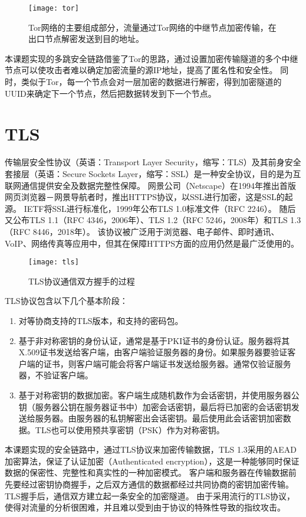 \begin{figure}[H]
  \centering
  \texttt{[image: tor]}
  \caption{Tor网络的主要组成部分，流量通过Tor网络的中继节点加密传输，在出口节点解密发送到目的地址。}
\end{figure}

本课题实现的多跳安全链路借鉴了Tor的思路，通过设置加密传输隧道的多个中继节点可以使攻击者难以确定加密流量的源IP地址，提高了匿名性和安全性。
同时，类似于Tor，每一个节点会对一层加密的数据进行解密，得到加密隧道的UUID来确定下一个节点，然后把数据转发到下一个节点。

\section{TLS}
传输层安全性协议（英语：Transport Layer Security，缩写：TLS）及其前身安全套接层（英语：Secure Sockets Layer，缩写：SSL）是一种安全协议，目的是为互联网通信提供安全及数据完整性保障。
网景公司（Netscape）在1994年推出首版网页浏览器－网景导航者时，推出HTTPS协议，以SSL进行加密，这是SSL的起源。
IETF将SSL进行标准化，1999年公布TLS 1.0标准文件（RFC 2246）。
随后又公布TLS 1.1（RFC 4346，2006年）、TLS 1.2（RFC 5246，2008年）和TLS 1.3（RFC 8446，2018年）。
该协议被广泛用于浏览器、电子邮件、即时通讯、VoIP、网络传真等应用中，但其在保障HTTPS方面的应用仍然是最广泛使用的。

\begin{figure}[H]
  \centering
  \texttt{[image: tls]}
  \caption{TLS协议通信双方握手的过程}
\end{figure}

TLS协议包含以下几个基本阶段：
\begin{enumerate}
  \item 对等协商支持的TLS版本，和支持的密码包。
  \item 基于非对称密钥的身份认证，通常是基于PKI证书的身份认证。服务器将其X.509证书发送给客户端，由客户端验证服务器的身份。如果服务器要验证客户端的证书，则客户端可能会将客户端证书发送给服务器。通常仅验证服务器，不验证客户端。
  \item 基于对称密钥的数据加密。客户端生成随机数作为会话密钥，并使用服务器公钥（服务器公钥在服务器证书中）加密会话密钥，最后将已加密的会话密钥发送给服务器。由服务器的私钥解密出会话密钥。最后使用此会话密钥加密数据。TLS也可以使用预共享密钥（PSK）作为对称密钥。
\end{enumerate}

本课题实现的安全链路中，通过TLS协议来加密传输数据，TLS 1.3采用的AEAD加密算法，保证了认证加密（Authenticated encryption），这是一种能够同时保证数据的保密性、完整性和真实性的一种加密模式。
客户端和服务器在传输数据前先要经过密钥协商握手，之后双方通信的数据都经过共同协商的密钥加密传输。
TLS握手后，通信双方建立起一条安全的加密隧道。
由于采用流行的TLS协议，使得对流量的分析很困难，并且难以受到由于协议的特殊性导致的指纹攻击。

